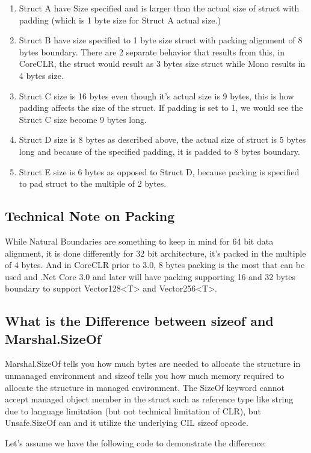 \begin{enumerate}
	\item Struct A have Size specified and is larger than the actual size of struct with padding (which is 1 byte size for Struct A actual size.)
	\item Struct B have size specified to 1 byte size struct with packing alignment of 8 bytes boundary. There are 2 separate behavior that results from this, in CoreCLR, the struct would result as 3 bytes size struct while Mono results in 4 bytes size.
	\item Struct C size is 16 bytes even though it's actual size is 9 bytes, this is how padding affects the size of the struct. If padding is set to 1, we would see the Struct C size become 9 bytes long.
	\item Struct D size is 8 bytes as described above, the actual size of struct is 5 bytes long and because of the specified padding, it is padded to 8 bytes boundary.
	\item Struct E size is 6 bytes as opposed to Struct D, because packing is specified to pad struct to the multiple of 2 bytes.
\end{enumerate}

\subsection{Technical Note on Packing}
While Natural Boundaries are something to keep in mind for 64 bit data alignment, it is done differently for 32 bit architecture, it's packed in the multiple of 4 bytes. And in CoreCLR prior to 3.0, 8 bytes packing is the most that can be used and .Net Core 3.0 and later will have packing supporting 16 and 32 bytes boundary to support Vector128<T> and Vector256<T>. 

\subsection{What is the Difference between sizeof and Marshal.SizeOf}
Marshal.SizeOf tells you how much bytes are needed to allocate the structure in unmanaged environment and sizeof tells you how much memory required to allocate the structure in managed environment. The SizeOf keyword cannot accept managed object member in the struct such as reference type like string due to language limitation (but not technical limitation of CLR), but Unsafe.SizeOf can and it utilize the underlying CIL sizeof opcode.

Let's assume we have the following code to demonstrate the difference:

